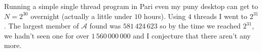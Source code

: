 \documentclass[leqno,a4paper]{article}
\begin{document}
Running a simple single thread program in Pari even my puny desktop can get to $N=2^{30}$ overnight (actually a little under $10$ hours). Using $4$ threads I went to $2^{31}$. The largest member of $\mathcal{A}$ found was $581\,424\,623$ so by the time we reached $2^{31}$, we hadn't seen one for over $1\,560\,000\,000$ and I conjecture that there aren't any more.
\end{document}
